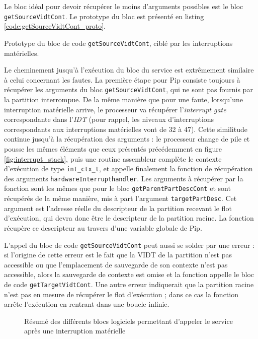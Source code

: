 		Le bloc idéal pour devoir récupérer le moins d'arguments possibles est le bloc \texttt{getSourceVidtCont}. Le prototype du bloc est présenté en listing \ref{code:getSourceVidtCont_proto}.

		\begin{listing}[!ht]
			\caption{Prototype du bloc de code \texttt{getSourceVidtCont}, ciblé par les interruptions matérielles.}
			\label{code:getSourceVidtCont_proto}
		\end{listing}

		Le cheminement jusqu'à l'exécution du bloc du service est extrêmement similaire à celui concernant les fautes. La première étape pour Pip consiste toujours à récupérer les arguments du bloc \texttt{getSourceVidtCont}, qui ne sont pas fournis par la partition interrompue. De la même manière que pour une faute, lorsqu'une interruption matérielle arrive, le processeur va récupérer l'\emph{interrupt gate} correspondante dans l'\emph{IDT} (pour rappel, les niveaux d'interruptions correspondants aux interruptions matérielles vont de 32 à 47). Cette similitude continue jusqu'à la récupération des arguments : le processeur change de pile et pousse les mêmes éléments que ceux présentés précédemment en figure \ref{fig:interrupt_stack}, puis une routine assembleur complète le contexte d'exécution de type \texttt{int\_ctx\_t}, et appelle finalement la fonction de récupération des arguments \texttt{hardwareInterrupthandler}. Les arguments à récupérer par la fonction sont les mêmes que pour le bloc \texttt{getParentPartDescCont} et sont récupérés de la même manière, mis à part l'argument \texttt{targetPartDesc}. Cet argument est l'adresse réelle du descripteur de la partition recevant le flot d'exécution, qui devra donc être le descripteur de la partition racine. La fonction récupère ce descripteur au travers d'une variable globale de Pip.

		L'appel du bloc de code \texttt{getSourceVidtCont} peut aussi se solder par une erreur : si l'origine de cette erreur est le fait que la VIDT de la partition n'est pas accessible ou que l'emplacement de sauvegarde de son contexte n'est pas accessible, alors la sauvegarde de contexte est omise et la fonction appelle le bloc de code \texttt{getTargetVidtCont}. Une autre erreur indiquerait que la partition racine n'est pas en mesure de récupérer le flot d'exécution ; dans ce cas la fonction arrête l'exécution en rentrant dans une boucle infinie.

		\begin{figure}[!b]
			\centering
			
			\caption{Résumé des différents blocs logiciels permettant d'appeler le service après une interruption matérielle}
			\label{fig:interrupt_software}
		\end{figure}

